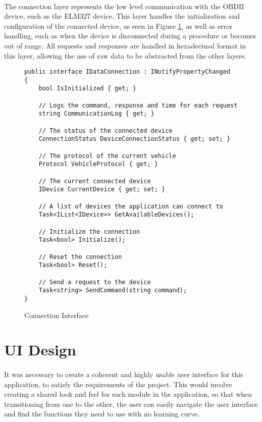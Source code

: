 	\paragraph{}{
	The connection layer represents the low level communication with the OBDII device, such as the ELM327 device. This layer handles the initialization and configuration of the connected device, as seen in Figure \ref{code:ConnectionInterface}, as well as error handling, such as when the device is disconnected during a procedure or becomes out of range. All requests and responses are handled in hexadecimal format in this layer, allowing the use of raw data to be abstracted from the other layers.
	}
	\begin{figure}[h]
		\begin{lstlisting}
public interface IDataConnection : INotifyPropertyChanged
{	
	bool IsInitialized { get; }

	// Logs the command, response and time for each request
	string CommunicationLog { get; }

	// The status of the connected device
    ConnectionStatus DeviceConnectionStatus { get; set; }

	// The protocol of the current vehicle
	Protocol VehicleProtocol { get; }

	// The current connected device
    IDevice CurrentDevice { get; set; }

	// A list of devices the application can connect to
	Task<IList<IDevice>> GetAvailableDevices();

	// Initialize the connection
	Task<bool> Initialize();	

	// Reset the connection
	Task<bool> Reset();

	// Send a request to the device
    Task<string> SendCommand(string command);
}
		\end{lstlisting}
		\caption{Connection Interface}
		\label{code:ConnectionInterface}
	\end{figure}

\section{UI Design}
	\paragraph{}{
	It was necessary to create a coherent and highly usable user interface for this application, to satisfy the requirements of the project. This would involve creating a shared look and feel for each module in the application, so that when transitioning from one to the other, the user can easily navigate the user interface and find the functions they need to use with no learning curve.
	}	
